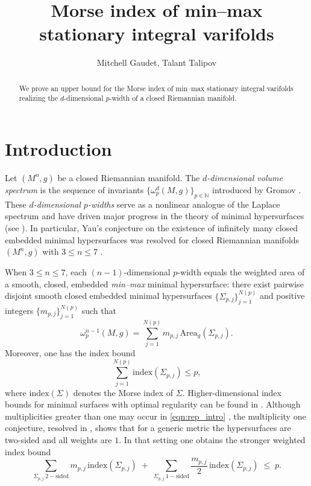 \documentclass[12pt,english]{article}
\title{Morse index of min--max stationary integral varifolds}
\author{Mitchell Gaudet, Talant Talipov}
\date{}
\theoremstyle{definition}
\begin{document}
\thispagestyle{empty}
\maketitle

\begin{abstract}
    We prove an upper bound for the Morse index of min--max stationary integral varifolds realizing the $d$-dimensional $p$-width of a closed Riemannian manifold.
\end{abstract}

\section{Introduction}

Let $(M^{n},g)$ be a closed Riemannian manifold. The \textit{$d$-dimensional volume spectrum} is the sequence of invariants $\{\omega_p^d(M,g)\}_{p\in\mathbb N}$ introduced by Gromov \cite{Gro06,Gro02,Gro10}. These \textit{$d$-dimensional $p$-widths} serve as a nonlinear analogue of the Laplace spectrum and have driven major progress in the theory of minimal hypersurfaces (see \cite{A1,rigidity,chodosh2020minimal,Dey,gaspar2020index,gaspar2018allen,gaspar2019weyl,irie2018density,yangyangli2, yangyangli1,LMN,marques2017existence,MN1,MarquesNeves,marques2021morse,Pi2,zhou2020multiplicity}). In particular, Yau’s conjecture on the existence of infinitely many closed embedded minimal hypersurfaces was resolved for closed Riemannian manifolds $(M^{n},g)$ with $3\le n \le 7$ \cite{song2018existence}.

When $3\le n\le 7$, each $(n-1)$-dimensional $p$-width equals the weighted area of a smooth, closed, embedded \textit{min--max} minimal hypersurface: there exist pairwise disjoint smooth closed embedded minimal hypersurfaces $\{\Sigma_{p,j}\}_{j=1}^{N(p)}$ and positive integers $\{m_{p,j}\}_{j=1}^{N(p)}$ such that
\begin{equation}\label{eqn:rep_intro}
    \omega_p^{n-1}(M,g)=\sum_{j=1}^{N(p)} m_{p,j}\,\mathrm{Area}_g(\Sigma_{p,j}).
\end{equation}
Moreover, one has the index bound \cite{MarquesNeves}
\begin{equation*}
    \sum_{j=1}^{N(p)} \mathrm{index}(\Sigma_{p,j}) \le p,
\end{equation*}
where $\mathrm{index}(\Sigma)$ denotes the Morse index of $\Sigma$. Higher-dimensional index bounds for minimal surfaces with optimal regularity can be found in \cite{yangyangli}. Although multiplicities greater than one may occur in \eqref{eqn:rep_intro} \cite{WangZhou_mult2}, the multiplicity one conjecture, resolved in \cite{chodosh2020minimal,zhou2020multiplicity}, shows that for a generic metric the hypersurfaces are two-sided and all weights are $1$.
 In that setting one obtains the stronger weighted index bound
\begin{equation*}
    \sum_{\Sigma_{p,j}\ \mathrm{2\!-\!sided}} m_{p,j}\,\mathrm{index}(\Sigma_{p,j})
    \;+\;
    \sum_{\Sigma_{p,j}\ \mathrm{1\!-\!sided}} \frac{m_{p,j}}{2}\,\mathrm{index}(\Sigma_{p,j})
    \;\le\; p .
\end{equation*}
\end{document}
